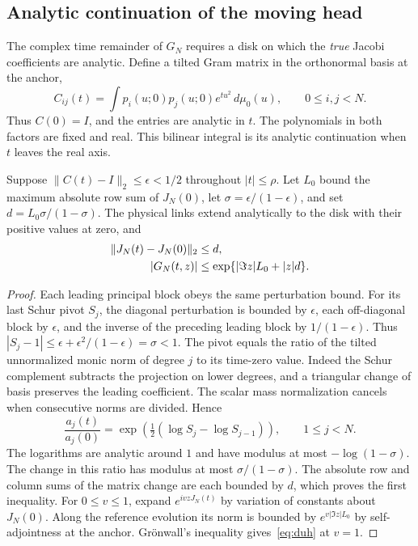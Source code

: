 \subsection{Analytic continuation of the moving head}
The complex time remainder of \(G_N\) requires a disk on which the \emph{true} Jacobi coefficients are analytic. Define a tilted Gram matrix in the orthonormal basis at the anchor,
\[
 C_{ij}(t)=\int p_i(u;0)p_j(u;0)e^{tu^2}\,d\mu_0(u),\qquad
             0\le i,j<N .
\]
Thus \(C(0)=I\), and the entries are analytic in \(t\). The polynomials in both factors are fixed and real. This bilinear integral is its analytic continuation when \(t\) leaves the real axis.

\begin{proposition}\label{prop:complex-head}
Suppose \(\|C(t)-I\|_2\le\epsilon<1/2\) throughout \(|t|\le\rho\).
Let \(L_0\) bound the maximum absolute row sum of \(J_N(0)\), let \(\sigma=\epsilon/(1-\epsilon)\), and set \(d=L_0\sigma/(1-\sigma)\). The physical links extend analytically to the disk with their positive values at zero, and
\begin{align}
 \|J_N(t)-J_N(0)\|_2&\le d,\notag\\
 |G_N(t,z)|&\le \exp\{|\Im z|L_0+|z|d\}. \label{eq:duh}
\end{align}
\end{proposition}
\begin{proof}
Each leading principal block obeys the same perturbation bound. For its last Schur pivot \(S_j\), the diagonal perturbation is bounded by \(\epsilon\), each off-diagonal block by \(\epsilon\), and the inverse of the preceding leading block by \(1/(1-\epsilon)\). Thus \(|S_j-1|\le\epsilon+\epsilon^2/(1-\epsilon)=\sigma<1\). The pivot equals the ratio of the tilted unnormalized monic norm of degree \(j\) to its time-zero value. Indeed the Schur complement subtracts the projection on lower degrees, and a triangular change of basis preserves the leading coefficient. The scalar mass normalization cancels when consecutive norms are divided. Hence
\[
 \frac{a_j(t)}{a_j(0)}
  =\exp\!\left(\tfrac12(\log S_j-\log S_{j-1})\right),\qquad 1\le j<N .
\]
The logarithms are analytic around \(1\) and have modulus at most \(-\log(1-\sigma)\). The change in this ratio has modulus at most \(\sigma/(1-\sigma)\). The absolute row and column sums of the matrix change are each bounded by \(d\), which proves the first inequality. For \(0\le v\le1\), expand \(e^{ivzJ_N(t)}\) by variation of constants about \(J_N(0)\). Along the reference evolution its norm is bounded by \(e^{v|\Im z|L_0}\) by self-adjointness at the anchor. Grönwall's inequality gives~\eqref{eq:duh} at \(v=1\).
\end{proof}


